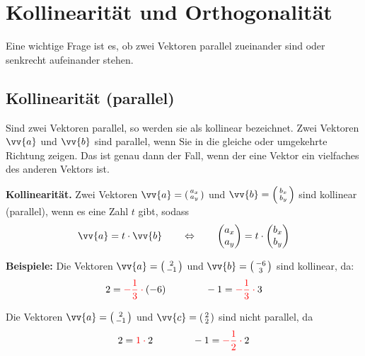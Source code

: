 \newpage
\section{Kollinearität und Orthogonalität}

Eine wichtige Frage ist es, ob zwei Vektoren parallel zueinander sind oder senkrecht aufeinander stehen.

\subsection{Kollinearität (parallel)}

Sind zwei Vektoren parallel, so werden sie als kollinear bezeichnet. Zwei Vektoren $\vv{a}$ und $\vv{b}$ sind parallel, wenn Sie in die gleiche oder umgekehrte Richtung zeigen. Das ist genau dann der Fall, wenn der eine Vektor ein vielfaches des anderen Vektors ist.

\begin{theorem}
  \textbf{Kollinearität.} Zwei Vektoren $\vv{a} = \tvec{a_{x},a_{y}}$ und $\vv{b} = \tvec{b_{x},b_{y}}$ sind kollinear (parallel), wenn es eine Zahl $t$ gibt, sodass
  \[
    \vv{a} = t\cdot\vv{b} \qquad\Leftrightarrow\qquad \dvec{a_{x},a_{y}} = t\cdot \dvec{b_{x},b_{y}}
  \]
\end{theorem}

\begin{center}
\end{center}

\begin{example}
  \textbf{Beispiele:} Die Vektoren $\vv{a} = \tvec{2,-1}$ und $\vv{b} = \tvec{-6,3}$ sind kollinear, da:
  \[
     2 = \mathcolor{red}{-\frac{1}{3}\cdot} (-6) \qquad\qquad -1 = \mathcolor{red}{-\frac{1}{3}\cdot} 3
  \]

  Die Vektoren $\vv{a} = \tvec{2,-1}$ und $\vv{c} = \tvec{2,2}$ sind nicht parallel, da
  \[
    2 = \mathcolor{red}{1\cdot} 2 \qquad\qquad -1 = \mathcolor{red}{-\frac{1}{2}\cdot} 2
  \]
\end{example}

